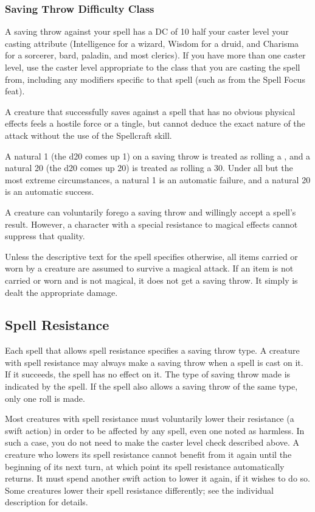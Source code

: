 \subsubsection{Saving Throw Difficulty Class}
A saving throw against your spell has a DC of 10 \add half your caster level \add your casting attribute (Intelligence for a wizard, Wisdom for a druid, and Charisma for a sorcerer, bard, paladin, and most clerics). If you have more than one caster level, use the caster level appropriate to the class that you are casting the spell from, including any modifiers specific to that spell (such as from the Spell Focus feat).

 A creature that successfully saves against a spell that has no obvious physical effects feels a hostile force or a tingle, but cannot deduce the exact nature of the attack without the use of the Spellcraft skill.

 A natural 1 (the d20 comes up 1) on a saving throw is treated as rolling a , and a natural 20 (the d20 comes up 20) is treated as rolling a 30. Under all but the most extreme circumstances, a natural 1 is an automatic failure, and a natural 20 is an automatic success.

 A creature can voluntarily forego a saving throw and willingly accept a spell's result. However, a character with a special resistance to magical effects cannot suppress that quality.

 Unless the descriptive text for the spell specifies otherwise, all items carried or worn by a creature are assumed to survive a magical attack. If an item is not carried or worn and is not magical, it does not get a saving throw. It simply is dealt the appropriate damage.

\subsection{Spell Resistance}
Each spell that allows spell resistance specifies a saving throw type. A creature with spell resistance may always make a saving throw when a spell is cast on it. If it succeeds, the spell has no effect on it. The type of saving throw made is indicated by the spell. If the spell also allows a saving throw of the same type, only one roll is made.

Most creatures with spell resistance must voluntarily lower their resistance (a swift action) in order to be affected by any spell, even one noted as harmless. In such a case, you do not need to make the caster level check described above. A creature who lowers its spell resistance cannot benefit from it again until the beginning of its next turn, at which point its spell resistance automatically returns. It must spend another swift action to lower it again, if it wishes to do so. Some creatures lower their spell resistance differently; see the individual description for details.

